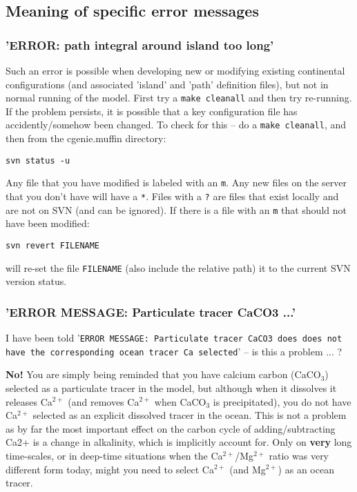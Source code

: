 \documentclass[11pt,fleqn]{book} %
\begin{document}

\subsection{Meaning of specific error messages}

\vspace{2mm}
\subsubsection{'ERROR: path integral around island too long'}

Such an error is possible when developing new or modifying existing continental configurations (and associated 'island' and 'path' definition files), but not in normal running of the model.
First try a \texttt{make cleanall} and then try re-running.
If the problem persists, it is possible that a key configuration file has accidently/somehow been changed. To check for this -- do a \texttt{make cleanall}, and then from the \textsf{\footnotesize cgenie.muffin} directory:
\vspace{-2pt}\begin{verbatim}
svn status -u
\end{verbatim}\vspace{-2pt}
Any file that you have modified is labeled with an \texttt{m}. Any new files on the server that you don't have will have a \texttt{*}. Files with a \texttt{?} are files that exist locally and are not on SVN (and can be ignored).
If there is a file with an \texttt{m} that should not have been modified:
\vspace{-2pt}\begin{verbatim}
svn revert FILENAME
\end{verbatim}\vspace{-2pt}
will re-set the file \texttt{FILENAME} (also include the relative path) it to the current SVN version status.

\vspace{2mm}
\subsubsection{'ERROR MESSAGE: Particulate tracer CaCO3 ...'}

I have been told '\texttt{ERROR MESSAGE: Particulate tracer CaCO3 does does not have the corresponding ocean tracer Ca selected}' -- is this a problem ... ?

\textbf{No!} You are simply being reminded that you have calcium carbon (CaCO$_{3}$) selected as a particulate tracer in the model, but although when it dissolves it releases Ca$^{2+}$ (and removes Ca$^{2+}$ when CaCO$_{3}$ is precipitated), you do not have Ca$^{2+}$ selected as an explicit dissolved tracer in the ocean. This is not a problem as by far the most important effect on the carbon cycle of adding/subtracting Ca2+ is a change in alkalinity, which is implicitly account for. Only on \textbf{very} long time-scales, or in deep-time situations when the Ca$^{2+}$/Mg$^{2+}$ ratio was very different form today, might you need to select Ca$^{2+}$ (and Mg$^{2+}$) as an ocean tracer.
\end{document}
